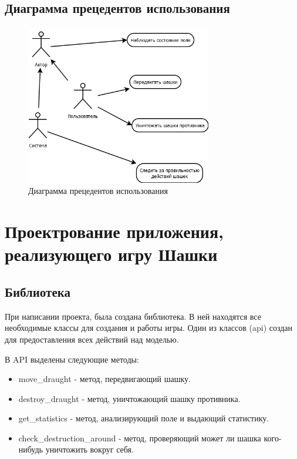 \documentclass[a4paper]{article}
\begin{document}
\subsection{Диаграмма прецедентов использования}

\begin{figure}[H]
	\begin{center}
		\includegraphics[scale=0.4, height=7cm]{Diagram1}
		\caption{Диаграмма прецедентов использования} 
		\label{pic:Diagram1} %
	\end{center}
\end{figure}

\section{Проектрование приложения, реализующего игру Шашки}

\subsection{Библиотека}
При написании проекта, была создана библиотека. В ней находятся все необходимые классы для создания и работы игры. Один из классов (api) создан для предоставления всех действий над моделью.

\noindent В API выделены следующие методы: 
\begin{itemize}
\item move\_draught - метод, передвигающий шашку.
\item destroy\_draught - метод, уничтожающий шашку противника.
\item get\_statistics - метод, анализирующий поле и выдающий статистику.
\item check\_destruction\_around - метод, проверяющий может ли шашка кого-нибудь уничтожить вокруг себя.
\end{itemize}
\end{document}
